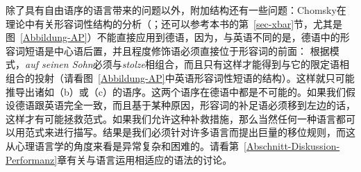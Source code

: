 除了具有自由语序的语言带来的问题以外，附加结构还有一些问题：Chomsky在\xbar 理论中有关形容词性结构的分析（\citealp[]{Chomsky70a}；还可以参考本书的第~\ref{sec-xbar}节，尤其是图~\vref{Abbildung-AP}）不能直接应用到德语，因为，与英语不同的是，德语中的形容词短语是中心语后置，并且程度修饰语必须直接位于形容词的前面：
\eal
{}
\zl
根据\xbar 模式，\emph{auf seinen Sohn}必须与\emph{stolze}相组合，而且只有这样才能得到与它的限定语相组合的\abar 投射（请看图~\vref{Abbildung-AP}中英语形容词性短语的结构）。这样就只可能推导出诸如（b）或（c）的语序。这两个语序在德语中都是不可能的。如果我们假设德语跟英语完全一致，而且基于某种原因，形容词的补足语必须移到左边的话，这样才有可能拯救\xbar 范式。如果我们允许这种补救措施，那么当然任何一种语言都可以用\xbar 范式来进行描写。结果是我们必须针对许多语言而提出巨量的移位规则，而这从心理语言学的角度来看是异常复杂和困难的。请看第~\ref{Abschnitt-Diskussion-Performanz}章有关与语言运用相适应的语法的讨论。 

